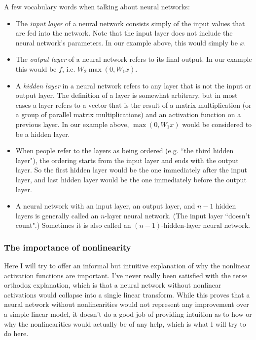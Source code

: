 A few vocabulary words when talking about neural networks:
\begin{itemize}
    \item The \emph{input layer} of a neural network consists simply of the input values that are fed into the network. Note that the input layer does not include the neural network's parameters. In our example above, this would simply be $x$.
    \item The \emph{output layer} of a neural network refers to its final output. In our example this would be $f$, i.e. $W_2\max\left(0, W_1x\right)$.
    \item A \emph{hidden layer} in a neural network refers to any layer that is not the input or output layer. The definition of a layer is somewhat arbitrary, but in most cases a layer refers to a vector that is the result of a matrix multiplication (or a group of parallel matrix multiplications) and an activation function on a previous layer. In our example above, $\max(0, W_1x)$ would be considered to be a hidden layer.
    \item When people refer to the layers as being ordered (e.g. ``the third hidden layer"), the ordering starts from the input layer and ends with the output layer. So the first hidden layer would be the one immediately after the input layer, and last hidden layer would be the one immediately before the output layer.
    \item A neural network with an input layer, an output layer, and $n-1$ hidden layers is generally called an $n$-layer neural network. (The input layer ``doesn't count".) Sometimes it is also called an $(n-1)$-hidden-layer neural network.
\end{itemize}
\subsubsection{The importance of nonlinearity}
Here I will try to offer an informal but intuitive explanation of why the nonlinear activation functions are important. I've never really been satisfied with the terse orthodox explanation, which is that a neural network without nonlinear activations would collapse into a single linear transform. While this proves that a neural network without nonlinearities would not represent any improvement over a simple linear model, it doesn't do a good job of providing intuition as to how or why the nonlinearities would actually be of any help, which is what I will try to do here.

